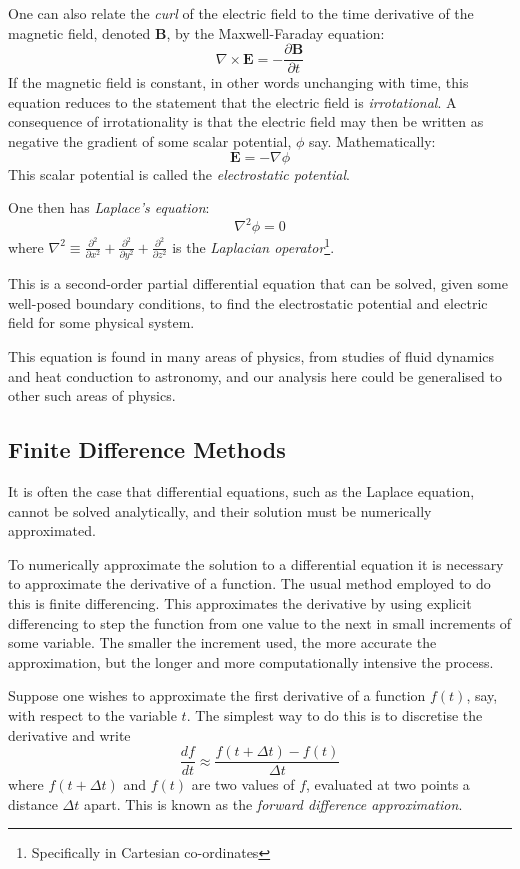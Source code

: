\documentclass[12pt, a4paper]{article}
\newcommand{\be}{\begin{equation}}
\newcommand{\ee}{\end{equation}}
\begin{document}
One can also relate the \emph{curl} of the electric field to the time
derivative of the magnetic field, denoted \textbf{B}, by the Maxwell-Faraday equation:
%
\be
\nabla \times \bm{E} = - \frac{\partial \bm{B}}{\partial t}
\ee
%
If the magnetic field is constant, in other words unchanging with time, this equation
reduces to the statement that the electric field is \emph{irrotational}. A
consequence of irrotationality is that the electric field may then be written as
negative the gradient of some scalar potential, $\phi$ say. Mathematically:
%
\be
\bm{E} = -\nabla \phi
\ee
%
This scalar potential is called the \emph{electrostatic potential}.

One then has \emph{Laplace's equation}:
%
\be
\nabla^2 \phi = 0
\ee
%
where
$\nabla^2 \equiv \frac{\partial^2}{\partial x^2}+\frac{\partial^2}{\partial y^2}+\frac{\partial^2}{\partial z^2}$ 
is the \emph{Laplacian operator}\footnote{Specifically in Cartesian co-ordinates}.

This is a second-order partial differential equation that can be solved, given some
well-posed boundary conditions, to find the electrostatic potential and electric field
for some physical system. 

This equation is found in many areas of physics, from studies of fluid dynamics and heat
conduction to astronomy, and our analysis here could be generalised to other such areas
of physics.

\subsection{Finite Difference Methods}

It is often the case that differential equations, such as the Laplace equation, cannot
be solved analytically, and their solution must be numerically approximated.

To numerically approximate the solution to a differential equation it is
necessary to approximate the derivative of a function. The usual method employed to
do this is finite differencing. This approximates the derivative by using explicit
differencing to step the function from one value to the next in small 
increments of some variable. The smaller the increment used, the more accurate
the approximation, but the longer and more computationally intensive the process.

Suppose one wishes to approximate the first derivative of a function $f(t)$, say,
with respect to the variable $t$. The simplest way to do this is to discretise the
derivative and write
%
\be
\frac{df}{dt} \approx \frac{f(t+\Delta t) - f(t)}{\Delta t}
\ee
%
where $f(t+\Delta t)$ and $f(t)$ are two values of $f$, evaluated at two points
a distance $\Delta t$ apart. This is known as the \emph{forward difference approximation}.
\end{document}

